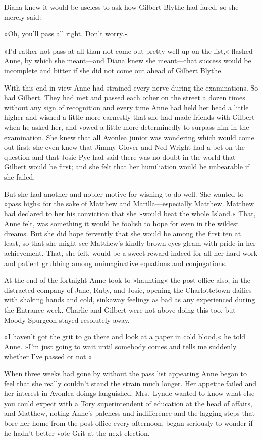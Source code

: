 Diana knew it would be useless to ask how Gilbert Blythe had fared, so she merely said:

»Oh, you'll pass all right. Don't worry.«

»I'd rather not pass at all than not come out pretty well up on the list,« flashed Anne, by which she meant—and Diana knew she meant—that success would be incomplete and bitter if she did not come out ahead of Gilbert Blythe.

With this end in view Anne had strained every nerve during the examinations. So had Gilbert. They had met and passed each other on the street a dozen times without any sign of recognition and every time Anne had held her head a little higher and wished a little more earnestly that she had made friends with Gilbert when he asked her, and vowed a little more determinedly to surpass him in the examination. She knew that all Avonlea junior was wondering which would come out first; she even knew that Jimmy Glover and Ned Wright had a bet on the question and that Josie Pye had said there was no doubt in the world that Gilbert would be first; and she felt that her humiliation would be unbearable if she failed.

But she had another and nobler motive for wishing to do well. She wanted to »pass high« for the sake of Matthew and Marilla—especially Matthew. Matthew had declared to her his conviction that she »would beat the whole Island.« That, Anne felt, was something it would be foolish to hope for even in the wildest dreams. But she did hope fervently that she would be among the first ten at least, so that she might see Matthew's kindly brown eyes gleam with pride in her achievement. That, she felt, would be a sweet reward indeed for all her hard work and patient grubbing among unimaginative equations and conjugations.

At the end of the fortnight Anne took to »haunting« the post office also, in the distracted company of Jane, Ruby, and Josie, opening the Charlottetown dailies with shaking hands and cold, sinkaway feelings as bad as any experienced during the Entrance week. Charlie and Gilbert were not above doing this too, but Moody Spurgeon stayed resolutely away.

»I haven't got the grit to go there and look at a paper in cold blood,« he told Anne. »I'm just going to wait until somebody comes and tells me suddenly whether I've passed or not.«

When three weeks had gone by without the pass list appearing Anne began to feel that she really couldn't stand the strain much longer. Her appetite failed and her interest in Avonlea doings languished. Mrs.~Lynde wanted to know what else you could expect with a Tory superintendent of education at the head of affairs, and Matthew, noting Anne's paleness and indifference and the lagging steps that bore her home from the post office every afternoon, began seriously to wonder if he hadn't better vote Grit at the next election.

